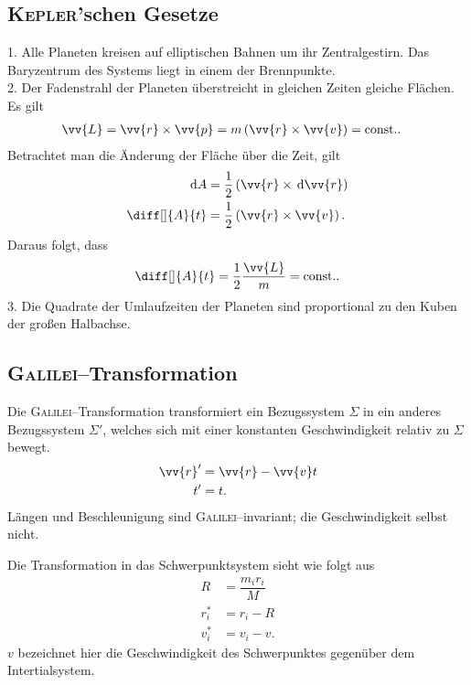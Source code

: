 \subsection{\textsc{Kepler}'schen Gesetze}
1. Alle Planeten kreisen auf elliptischen Bahnen um ihr Zentralgestirn. 
Das Baryzentrum des Systems liegt in einem der Brennpunkte.\\
2. Der Fadenstrahl der Planeten überstreicht in gleichen Zeiten gleiche Flächen.
Es gilt
\begin{align} 
        \vv{L}&=\vv{r}\times \vv{p}=m\left(\vv{r}\times \vv{v}\right)=\text{const.}
.\end{align} 
Betrachtet man die Änderung der Fläche über die Zeit, gilt
\begin{align} 
        \td A&=\dfrac{1}{2}\left(\vv{r}\times \td\vv{r}\right)\\
        \diff[]{A}{t}&=\dfrac{1}{2}\left(\vv{r}\times \vv{v}\right)
.\end{align} 
Daraus folgt, dass
\begin{align} 
        \diff[]{A}{t}=\dfrac{1}{2}\dfrac{\vv{L}}{m}=\text{const.}
.\end{align}
3. Die Quadrate der Umlaufzeiten der Planeten sind proportional zu den Kuben der großen Halbachse.

\subsection{\textsc{Galilei}--Transformation}
Die \textsc{Galilei}--Transformation transformiert ein Bezugssystem $\Sigma$ in ein anderes Bezugssystem $\Sigma'$, welches sich mit einer konstanten Geschwindigkeit relativ zu $\Sigma$ bewegt.
\begin{align} 
        \vv{r}'&=\vv{r}-\vv{v}t\\
        t'&=t
.\end{align} 
Längen und Beschleunigung sind \textsc{Galilei}--invariant; die Geschwindigkeit selbst nicht.\par
Die Transformation in das Schwerpunktsystem sieht wie folgt aus
\begin{align} 
        R&=\dfrac{m_ir_i}{M}\\
        r^*_i&=r_i-R\\
        v^*_i&=v_i-v
.\end{align} 
$v$ bezeichnet hier die Geschwindigkeit des Schwerpunktes gegenüber dem Intertialsystem.

